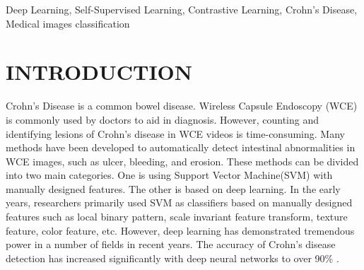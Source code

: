\documentclass[conference]{IEEEtran}
\begin{document}
\begin{IEEEkeywords}
Deep Learning, Self-Supervised Learning, Contrastive Learning, Crohn's Disease, Medical images classification
\end{IEEEkeywords}

\section{INTRODUCTION}
Crohn's Disease is a common bowel disease\cite{capsule_Crohn}. 
Wireless Capsule Endoscopy (WCE) is commonly used by doctors to aid in diagnosis. However, counting and identifying lesions of Crohn's disease  in WCE videos is time-consuming. Many methods \cite{review_WCE_CNN} have been developed to automatically detect intestinal abnormalities in WCE images, such as ulcer, bleeding, and erosion.
These methods can be divided into two main categories. One is using Support Vector Machine(SVM)
\cite{hajo2012segmentation,chen2012ulcer,charisis2012capsule,eid2013curvelet,szczypinski2014texture,yeh2014bleeding,iakovidis2014automatic,yuan2015saliency,charisis2016use,liaqat2018automated,alotaibi2013empirical,souaidi2019multi} with manually designed features. 
The other is based on deep learning\cite{georgakopoulos2016weakly,fan2018computer,aoki2019automatic,alaskar2019application,crohIPI,de2021multi}. 
In the early years, researchers primarily used SVM as classifiers based on manually designed features such as local binary pattern\cite{lbp_sift_bagOfWords_svm}, scale invariant feature transform\cite{lbp_sift_bagOfWords_svm}, texture feature\cite{saliencyMap_gabor_lbp_svm}, color feature\cite{colorFeature_3layerMLP}, etc. However, deep learning has demonstrated tremendous power in a number of fields in recent years. The accuracy of Crohn's disease detection has increased significantly with deep neural networks to over 90\% \cite{review_WCE_CNN}. 
\end{document}
